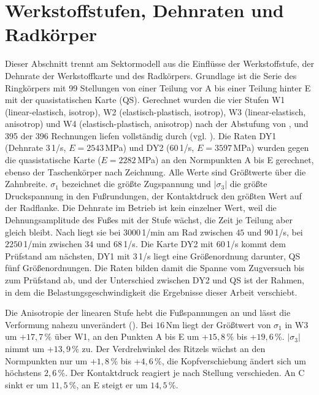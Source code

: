 \section{Werkstoffstufen, Dehnraten und Radkörper}
\label{sec:stufen_raten_koerper}

Dieser Abschnitt trennt am Sektormodell aus  die Einflüsse der Werkstoffstufe, der Dehnrate der Werkstoffkarte und des Radkörpers. Grundlage ist die Serie des Ringkörpers mit 99 Stellungen von einer Teilung vor A bis einer Teilung hinter E mit der quasistatischen Karte (QS). Gerechnet wurden die vier Stufen W1 (linear-elastisch, isotrop), W2 (elastisch-plastisch, isotrop), W3 (linear-elastisch, anisotrop) und W4 (elastisch-plastisch, anisotrop) nach der Abstufung von \cite{Sto18}, und 395 der 396 Rechnungen liefen vollständig durch (vgl. ). Die Raten DY1 (Dehnrate $3$\,1/s, $E = 2543$\,MPa) und DY2 ($60$\,1/s, $E = 3597$\,MPa) wurden gegen die quasistatische Karte ($E = 2282$\,MPa) an den Normpunkten A bis E gerechnet, ebenso der Taschenkörper nach Zeichnung. Alle Werte sind Größtwerte über die Zahnbreite. $\sigma_{\mathrm{1}}$ bezeichnet die größte Zugspannung und $|\sigma_{\mathrm{3}}|$ die größte Druckspannung in den Fußrundungen, der Kontaktdruck den größten Wert auf der Radflanke. Die Dehnrate im Betrieb ist kein einzelner Wert, weil die Dehnungsamplitude des Fußes mit der Stufe wächst, die Zeit je Teilung aber gleich bleibt. Nach  liegt sie bei $3000$\,1/min am Rad zwischen $45$ und $90$\,1/s, bei $2250$\,1/min zwischen $34$ und $68$\,1/s. Die Karte DY2 mit $60$\,1/s kommt dem Prüfstand am nächsten, DY1 mit $3$\,1/s liegt eine Größenordnung darunter, QS fünf Größenordnungen. Die Raten bilden damit die Spanne vom Zugversuch bis zum Prüfstand ab, und der Unterschied zwischen DY2 und QS ist der Rahmen, in dem die Belastungsgeschwindigkeit die Ergebnisse dieser Arbeit verschiebt.

Die Anisotropie der linearen Stufe hebt die Fußspannungen an und lässt die Verformung nahezu unverändert (). Bei $16$\,Nm liegt der Größtwert von $\sigma_{\mathrm{1}}$ in W3 um +$17{,}7$\,\% über W1, an den Punkten A bis E um +$15{,}8$\,\% bis +$19{,}6$\,\%. $|\sigma_{\mathrm{3}}|$ nimmt um +$13{,}9$\,\% zu. Der Verdrehwinkel des Ritzels wächst an den Normpunkten nur um +$1{,}8$\,\% bis +$4{,}6$\,\%, die Kopfverschiebung ändert sich um höchstens $2{,}6$\,\%. Der Kontaktdruck reagiert je nach Stellung verschieden. An C sinkt er um $11{,}5$\,\%, an E steigt er um $14{,}5$\,\%.

